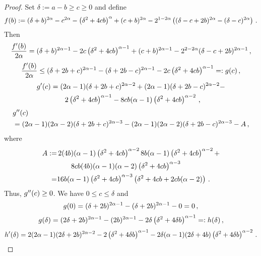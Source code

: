 \begin{proof}	
	Set $\delta := a-b \geq c \geq 0$ and define
	\begin{equation*}
		f(b) := (\delta+b)^{2\alpha}-c^{2\alpha}-\left( \delta^2+4cb \right)^{\alpha}+(c+b)^{2\alpha} -2^{1-2\alpha} \left( 	(\delta-c + 2b)^{2\alpha}  -  (\delta-c)^{2\alpha} \right)
		\, .
	\end{equation*}
	Then
	\begin{equation*}
		\frac{f^\prime(b)}{2\alpha} =
		(\delta+b)^{2\alpha-1}-2c\left( \delta^2+4cb \right)^{\alpha-1}+(c+b)^{2\alpha-1} -2^{2-2\alpha} (\delta-c + 2b)^{2\alpha-1}
		\, ,
	\end{equation*}
	\begin{align*}
		\frac{f^\prime(b)}{2\alpha} 
		\leq 
		(\delta+2b+c)^{2\alpha-1}- (\delta+2b-c)^{2\alpha-1} - 2c\left( \delta^2+4cb \right)^{\alpha-1} =: g(c)
		\, ,
	\end{align*}
	\begin{align*}
		g^\prime(c) 
		&= (2\alpha-1)(\delta+2b+c)^{2\alpha-2}+ (2\alpha-1)(\delta+2b-c)^{2\alpha-2} - 
		\\&\qquad 2\left( \delta^2+4cb \right)^{\alpha-1} -8cb(\alpha-1)\left( \delta^2+4cb \right)^{\alpha-2}
		\, ,
	\end{align*}
	\begin{align*}
		&g^{\prime\prime}(c)\\ &= (2\alpha-1)(2\alpha-2)(\delta+2b+c)^{2\alpha-3}- 
		(2\alpha-1)(2\alpha-2)(\delta+2b-c)^{2\alpha-3}  - A\, ,
	\end{align*}
	where
	\begin{align*}
		A := &\,2(4b)(\alpha-1)\left( \delta^2+4cb \right)^{\alpha-2} 
		8b(\alpha-1)\left( \delta^2+4cb \right)^{\alpha-2}
		+\\&\qquad
		8cb(4b)(\alpha-1)(\alpha-2)\left( \delta^2+4cb \right)^{\alpha-3}
		\\=&
		16b(\alpha-1)\left( \delta^2+4cb \right)^{\alpha-3} 
		\left( \delta^2+4cb + 2cb(\alpha-2) \right)
		\, .
	\end{align*}
	Thus, 	$g^{\prime\prime}(c) \geq 0$.
	We have $0 \leq c \leq \delta$ and
	\begin{equation*}
		g(0) =
		(\delta+2b)^{2\alpha-1}- (\delta+2b)^{2\alpha-1}-0=0
		\, ,
	\end{equation*}
	\begin{equation*}
		g(\delta) = (2\delta+2b)^{2\alpha-1}- (2b)^{2\alpha-1} - 2\delta\left( \delta^2+4\delta b \right)^{\alpha-1} =: h(\delta)\, ,
	\end{equation*}
	\begin{equation*}
		h\pr(\delta) = 2(2\alpha-1)(2\delta+2b)^{2\alpha-2}-2\br{\delta^2+4\delta b}^{\alpha-1}-2\delta(\alpha-1)(2\delta+4b)\br{\delta^2+4\delta b}^{\alpha-2}\eqfs

\end{equation*}
\end{proof}
